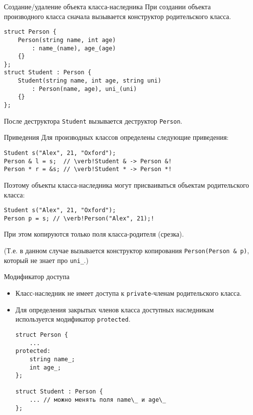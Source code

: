 \documentclass{beamer}
\begin{document}
\begin{frame}[fragile]{Создание/удаление объекта класса-наследника}
При создании объекта производного класса сначала вызывается конструктор
родительского класса.
\begin{lstlisting}
struct Person {
    Person(string name, int age)
        : name_(name), age_(age)
    {}
};
struct Student : Person {
    Student(string name, int age, string uni)
        : Person(name, age), uni_(uni)
    {}
};
\end{lstlisting}
После деструктора {\tt Student} вызывается деструктор {\tt Person}.
\end{frame}
\begin{frame}[fragile]{Приведения}
Для производных классов определены следующие приведения:
\begin{lstlisting}
Student s("Alex", 21, "Oxford");
Person & l = s;  // \verb!Student & -> Person &!
Person * r = &s; // \verb!Student * -> Person *!
\end{lstlisting}
Поэтому объекты класса-наследника могут присваиваться
объектам родительского класса:
\begin{lstlisting}
Student s("Alex", 21, "Oxford");
Person p = s; // \verb!Person("Alex", 21);!
\end{lstlisting}
При этом копируются только поля класса-родителя (срезка).

(Т.е. в данном случае вызывается конструктор копирования
{\tt Person(Person \& p)}, который не знает про {\tt uni\_}.)
\end{frame}

\begin{frame}[fragile]{Модификатор доступа }
\begin{itemize}
    \item Класс-наследник не имеет доступа к {\tt private}-членам 
        родительского класса.
        
    \item Для определения закрытых членов класса доступных наследникам
        используется модификатор {\tt protected}.
\begin{lstlisting}
struct Person {
    ...
protected:
    string name_;
    int age_;    
};

struct Student : Person {
    ... // можно менять поля name\_ и age\_
};
\end{lstlisting}
\end{itemize}
\end{frame}
\end{document}

